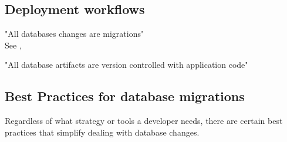 \begin{enumerate}
\end{enumerate}



\subsection{Deployment workflows}
"All databases changes are migrations" \cite{Robles2021}\\
See \cite{Piairo2018}, \cite{Sadalage2016}

%
"All database artifacts are version controlled with application code"

%

%


\subsection{Best Practices for database migrations}%
%

Regardless of what strategy or tools a developer needs, there are certain best practices that simplify dealing with database changes.

